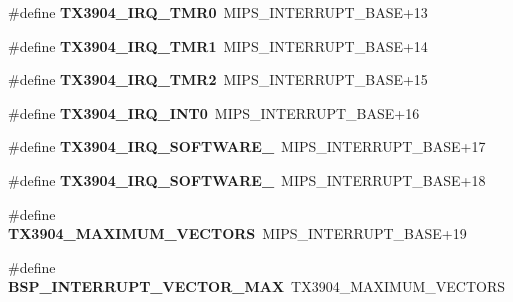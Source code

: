 \begin{DoxyCompactItemize}
\#define {\bfseries T\+X3904\+\_\+\+I\+R\+Q\+\_\+\+T\+M\+R0}~M\+I\+P\+S\+\_\+\+I\+N\+T\+E\+R\+R\+U\+P\+T\+\_\+\+B\+A\+SE+13
\item 
\mbox{\label{group__bsp__interrupt_ga1e33403f655c5d518266d1a197c5c50a}} 
\#define {\bfseries T\+X3904\+\_\+\+I\+R\+Q\+\_\+\+T\+M\+R1}~M\+I\+P\+S\+\_\+\+I\+N\+T\+E\+R\+R\+U\+P\+T\+\_\+\+B\+A\+SE+14
\item 
\mbox{\label{group__bsp__interrupt_ga9c025213329b14d5b0e06c0a87578047}} 
\#define {\bfseries T\+X3904\+\_\+\+I\+R\+Q\+\_\+\+T\+M\+R2}~M\+I\+P\+S\+\_\+\+I\+N\+T\+E\+R\+R\+U\+P\+T\+\_\+\+B\+A\+SE+15
\item 
\mbox{\label{group__bsp__interrupt_gaceabdbf72d90c8997742e780ac526a15}} 
\#define {\bfseries T\+X3904\+\_\+\+I\+R\+Q\+\_\+\+I\+N\+T0}~M\+I\+P\+S\+\_\+\+I\+N\+T\+E\+R\+R\+U\+P\+T\+\_\+\+B\+A\+SE+16
\item 
\mbox{\label{group__bsp__interrupt_ga23855204f2710563bd0b65aa10330bab}} 
\#define {\bfseries T\+X3904\+\_\+\+I\+R\+Q\+\_\+\+S\+O\+F\+T\+W\+A\+R\+E\+\_}~M\+I\+P\+S\+\_\+\+I\+N\+T\+E\+R\+R\+U\+P\+T\+\_\+\+B\+A\+SE+17
\item 
\mbox{\label{group__bsp__interrupt_ga3cf883a085fe7acbef4bd6182711391d}} 
\#define {\bfseries T\+X3904\+\_\+\+I\+R\+Q\+\_\+\+S\+O\+F\+T\+W\+A\+R\+E\+\_}~M\+I\+P\+S\+\_\+\+I\+N\+T\+E\+R\+R\+U\+P\+T\+\_\+\+B\+A\+SE+18
\item 
\mbox{\label{group__bsp__interrupt_ga2a0e90a25cf7052cd7f2764b84c8739d}} 
\#define {\bfseries T\+X3904\+\_\+\+M\+A\+X\+I\+M\+U\+M\+\_\+\+V\+E\+C\+T\+O\+RS}~M\+I\+P\+S\+\_\+\+I\+N\+T\+E\+R\+R\+U\+P\+T\+\_\+\+B\+A\+SE+19
\item 
\mbox{\label{group__bsp__interrupt_gae4a2cdda5816a4c83c2fac0a49880c6e}} 
\#define {\bfseries B\+S\+P\+\_\+\+I\+N\+T\+E\+R\+R\+U\+P\+T\+\_\+\+V\+E\+C\+T\+O\+R\+\_\+\+M\+AX}~T\+X3904\+\_\+\+M\+A\+X\+I\+M\+U\+M\+\_\+\+V\+E\+C\+T\+O\+RS
\item 
\mbox{\label{group__bsp__interrupt_ga64cbb02dfea4d6923abccaa0087d2a0d}} 

\end{DoxyCompactItemize}
